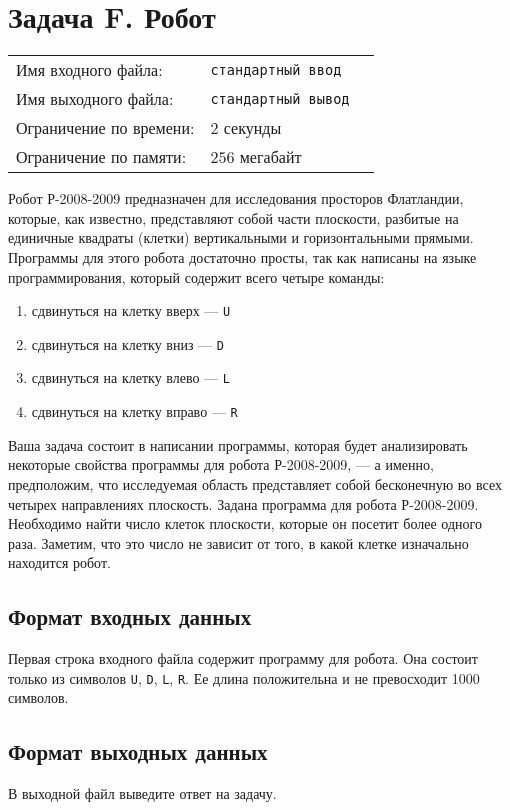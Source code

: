 \documentclass[12pt]{scrartcl}
\newcommand{\inputFile}{стандартный ввод}
\newcommand{\outputFile}{стандартный вывод}
\begin{document}
\section*{Задача F. Робот}

\begin{tabularx}{\textwidth}{l l X}
    Имя входного файла: & \texttt{\inputFile} \\
    Имя выходного файла: & \texttt{\outputFile} \\
    Ограничение по времени: & $2$ секунды \\
    Ограничение по памяти: & $256$ мегабайт \\
\end{tabularx}

Робот Р-2008-2009 предназначен для исследования просторов Флатландии,
которые, как известно, представляют собой части плоскости, разбитые на единичные квадраты (клетки)
вертикальными и горизонтальными прямыми.
Программы для этого робота достаточно просты, так как написаны на языке программирования,
который содержит всего четыре команды:

\begin{enumerate}
    \item сдвинуться на клетку вверх --- \texttt{U}
    \item сдвинуться на клетку вниз --- \texttt{D}
    \item сдвинуться на клетку влево --- \texttt{L}
    \item сдвинуться на клетку вправо --- \texttt{R}
\end{enumerate}

Ваша задача состоит в написании программы, которая будет анализировать некоторые свойства программы для
робота Р-2008-2009, --- а именно, предположим, что исследуемая область представляет собой бесконечную
во всех четырех направлениях плоскость. Задана программа для робота Р-2008-2009.
Необходимо найти число клеток плоскости, которые он посетит более одного раза.
Заметим, что это число не зависит от того, в какой клетке изначально находится робот. 

\subsection*{Формат входных данных}
Первая строка входного файла содержит программу для робота.
Она состоит только из символов \texttt{U}, \texttt{D}, \texttt{L}, \texttt{R}.
Ее длина положительна и не превосходит 1000 символов. 

\subsection*{Формат выходных данных}
В выходной файл выведите ответ на задачу.
\end{document}
